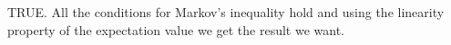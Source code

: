 TRUE. All the conditions for Markov's inequality hold and using the linearity property of the
expectation value we get the result we want.
